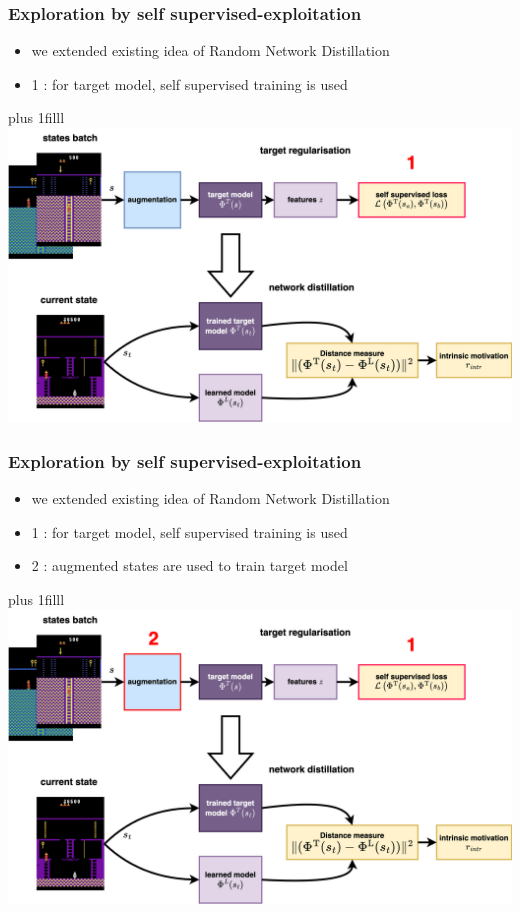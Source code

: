 \documentclass{beamer}
\begin{document}
\begin{frame}
  \frametitle{Exploration by self supervised-exploitation}

  \begin{itemize}
    \item we extended existing idea of Random Network Distillation
    \item {\color{red} 1 : } for target model, self supervised training is used
  \end{itemize}

  \vskip 0pt plus 1filll
    \centering
    \includegraphics[scale=0.4]{../diagrams/cnd/cnd-cnd-1.png}

\end{frame}

\begin{frame}
  \frametitle{Exploration by self supervised-exploitation}

  \begin{itemize}
    \item we extended existing idea of Random Network Distillation
    \item {\color{red} 1 : } for target model, self supervised training is used
    \item {\color{red} 2 : } augmented states are used to train target model
  \end{itemize} 

  \vskip 0pt plus 1filll
    \centering
    \includegraphics[scale=0.4]{../diagrams/cnd/cnd-cnd-2.png}

\end{frame}
\end{document}
